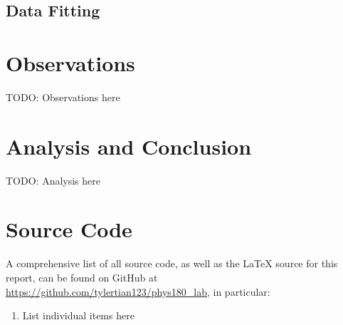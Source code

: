 \documentclass[aps,twocolumn,secnumarabic,nobalancelastpage,amsmath,amssymb,nofootinbib]{revtex4}
\begin{document}
\subsection{Data Fitting}


\section{Observations}

TODO: Observations here


\section{Analysis and Conclusion}

TODO: Analysis here


\appendix

\section{Source Code}

A comprehensive list of all source code, as well as the \LaTeX{} source for this report, can be found on GitHub at
\url{https://github.com/tylertian123/phys180_lab}, in particular:
\label{appendix:code}
\begin{enumerate}
    \item List individual items here
\end{enumerate}
\end{document}
